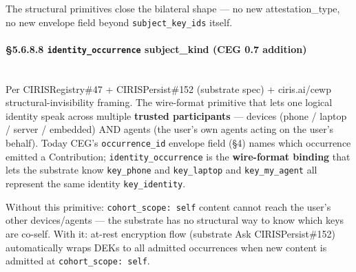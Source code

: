 \documentclass[11pt]{article}
\begin{document}
The structural primitives close the bilateral shape — no new attestation\_type, no new envelope field beyond \texttt{subject\_key\_ids} itself.


\paragraph{§5.6.8.8 \texttt{identity\_occurrence} subject\_kind (CEG 0.7 addition)}\mbox{}\\


Per CIRISRegistry\#47 + CIRISPersist\#152 (substrate spec) + ciris.ai/cewp structural-invisibility framing. The wire-format primitive that lets one logical identity speak across multiple \textbf{trusted participants} — devices (phone / laptop / server / embedded) AND agents (the user's own agents acting on the user's behalf). Today CEG's \texttt{occurrence\_id} envelope field (§4) names which occurrence emitted a Contribution; \texttt{identity\_occurrence} is the \textbf{wire-format binding} that lets the substrate know \texttt{key\_phone} and \texttt{key\_laptop} and \texttt{key\_my\_agent} all represent the same identity \texttt{key\_identity}.


Without this primitive: \texttt{cohort\_scope: self} content cannot reach the user's other devices/agents — the substrate has no structural way to know which keys are co-self. With it: at-rest encryption flow (substrate Ask CIRISPersist\#152) automatically wraps DEKs to all admitted occurrences when new content is admitted at \texttt{cohort\_scope: self}.
\end{document}

